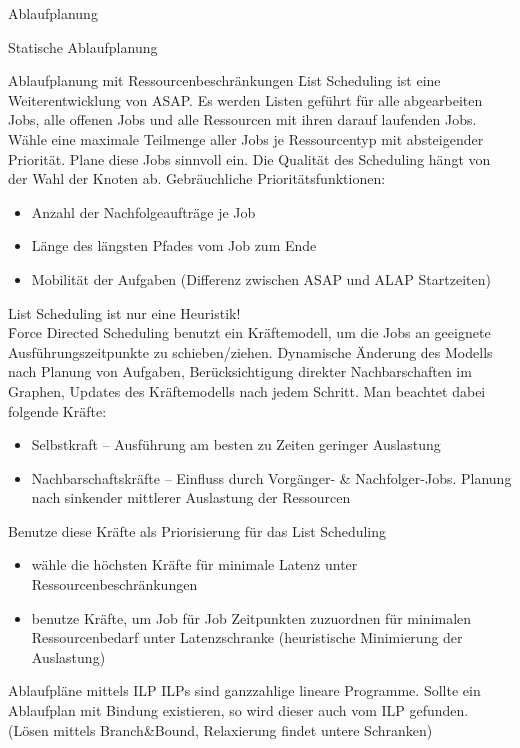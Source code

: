 \begin{chapter}{Ablaufplanung}
\begin{section}{Statische Ablaufplanung}
\begin{subsection}{Ablaufplanung mit Ressourcenbeschränkungen}
    \f{List Scheduling} ist eine Weiterentwicklung von ASAP. Es werden Listen geführt für alle abgearbeiten Jobs, alle offenen Jobs und alle Ressourcen mit ihren darauf laufenden Jobs. Wähle eine maximale Teilmenge aller Jobs je Ressourcentyp mit absteigender Priorität.  Plane diese Jobs sinnvoll ein. Die Qualität des Scheduling hängt von der Wahl der Knoten ab. Gebräuchliche Prioritätsfunktionen:
    \begin{itemize}
     \item Anzahl der Nachfolgeaufträge je Job
     \item Länge des längsten Pfades vom Job zum Ende
     \item Mobilität der Aufgaben (Differenz zwischen ASAP und ALAP Startzeiten)
    \end{itemize}
    List Scheduling ist nur eine Heuristik!\\
    
    \f{Force Directed Scheduling} benutzt ein Kräftemodell, um die Jobs an geeignete Ausführungszeitpunkte zu schieben/ziehen. Dynamische Änderung des Modells nach Planung von Aufgaben, Berücksichtigung direkter Nachbarschaften im Graphen, Updates des Kräftemodells nach jedem Schritt. Man beachtet dabei folgende Kräfte:
    \begin{itemize}
     \item Selbstkraft -- Ausführung am besten zu Zeiten geringer Auslastung
     \item Nachbarschaftskräfte -- Einfluss durch Vorgänger- \& Nachfolger-Jobs. Planung nach sinkender mittlerer Auslastung der Ressourcen
    \end{itemize}
    Benutze diese Kräfte als Priorisierung für das List Scheduling
    \begin{itemize}
      \item wähle die höchsten Kräfte für minimale Latenz unter Ressourcenbeschränkungen
      \item benutze Kräfte, um Job für Job Zeitpunkten zuzuordnen für minimalen Ressourcenbedarf unter Latenzschranke (heuristische Minimierung der Auslastung)
    \end{itemize}
   \end{subsection}
   
   \begin{subsection}{Ablaufpläne mittels ILP}
    ILPs sind ganzzahlige lineare Programme. Sollte ein Ablaufplan mit Bindung existieren, so wird dieser auch vom ILP gefunden. (Lösen mittels Branch\&Bound, Relaxierung findet untere Schranken)
   \end{subsection}


  \end{section}
\end{chapter}
